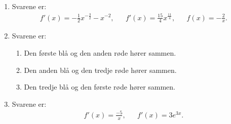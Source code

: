 \begin{enumerate}
	\item Svarene er:
	\begin{align*}
		f'(x)=-\frac{1}{2}x^{-\frac{3}{2}}-x^{-2},&& f'(x)=\frac{15}{4}x^{\frac{11}{4}},&&f(x)=-\frac{2}{x}.
	\end{align*}
	
	

	
	\item Svarene er:
	\begin{enumerate}
		\item Den første blå og den anden røde hører sammen.
		\item Den anden blå og den tredje røde hører sammen.
		\item Den tredje blå og den første røde hører sammen.
	\end{enumerate}
	

	
	\item Svarene er:
	\begin{align*}
	f'(x)=\frac{-5}{x},&& f'(x)=3e^{3x}.
	\end{align*}
	
	\end{enumerate}